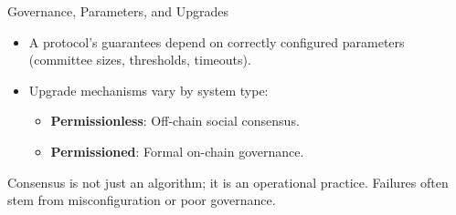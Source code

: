 \documentclass[aspectratio=169]{beamer}
\begin{document}
\begin{frame}{Governance, Parameters, and Upgrades}
    \begin{itemize}
        \item A protocol's guarantees depend on correctly configured parameters (committee sizes, thresholds, timeouts).
        \item Upgrade mechanisms vary by system type:
        \begin{itemize}
            \item \textbf{Permissionless}: Off-chain social consensus.
            \item \textbf{Permissioned}: Formal on-chain governance.
        \end{itemize}
    \end{itemize}
    \begin{tcolorbox}[enhanced, colback=red!20, colframe=red!75!black, fonttitle=\bfseries, title={The Meta-Point}, rounded corners, drop shadow]
    Consensus is not just an algorithm; it is an operational practice. Failures often stem from misconfiguration or poor governance.
    \end{tcolorbox}
\end{frame}
\end{document}
